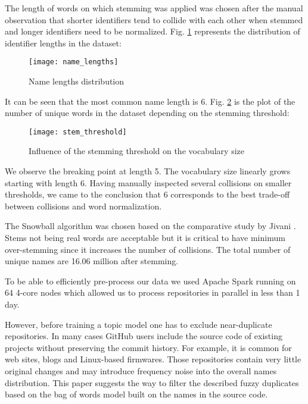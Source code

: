 \documentclass[conference,10pt]{IEEEtran}
\begin{document}
The length of words on which stemming was applied was chosen after the manual observation that shorter identifiers tend to collide with each other when stemmed and longer identifiers need to be normalized. Fig. \ref{name_lengths} represents the distribution of identifier lengths in the dataset:

\begin{figure}
\caption{Name lengths distribution}
\label{name_lengths}
\begin{center}
\texttt{[image: name\_lengths]}
\end{center}
\end{figure}

It can be seen that the most common name length is 6. Fig. \ref{stem_threshold} is the plot of the number of unique words in the dataset depending on the stemming threshold:

\begin{figure}
\caption{Influence of the stemming threshold on the vocabulary size}
\label{stem_threshold}
\begin{center}
\texttt{[image: stem\_threshold]}
\end{center}
\end{figure}

We observe the breaking point at length 5. The vocabulary size linearly grows starting with length 6. Having manually inspected several collisions on smaller thresholds, we came to the conclusion that 6 corresponds to the best trade-off between collisions and word normalization.

The Snowball algorithm was chosen based on the comparative study by Jivani \cite{Anjali_acomparative}. Stems not being real words are acceptable but it is critical to have minimum over-stemming since it increases the number of collisions. The total number of unique names are 16.06 million after stemming.

To be able to efficiently pre-process our data we used Apache Spark \cite{Spark} running on 64 4-core nodes which allowed us to process repositories in parallel in less than 1 day. 

However, before training a topic model one has to exclude near-duplicate repositories. In many cases GitHub users
include the source code of existing projects without preserving the commit history. For example, it is common for web sites, blogs and Linux-based firmwares. Those repositories contain very little original changes and may introduce frequency noise into the overall names distribution. This paper suggests the way to filter the described fuzzy duplicates based on the bag of words model built on the names in the source code.
\end{document}
